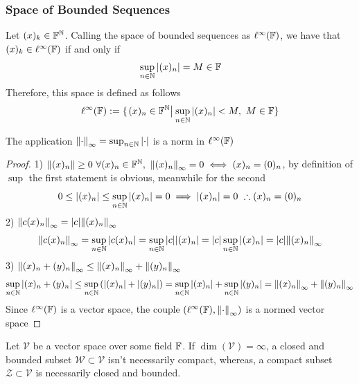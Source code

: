 \documentclass[../complete.tex]{subfiles}
\begin{document}
\subsubsection{Space of Bounded Sequences}
\begin{dfn}
	Let $(x)_k\in\mathbb{F}^{\mathbb{N}}$. Calling the space of bounded sequences as $\ell^\infty(\mathbb{F})$, we have that $(x)_k\in\ell^\infty(\mathbb{F})$ if and only if
	\begin{equation}
		\sup_{n\in\mathbb{N}}\abs{(x)_n}=M\in\mathbb{F}
		\label{eq:boundedseq}
	\end{equation}
	Therefore, this space is defined as follows
	\begin{equation}
		\ell^\infty(\F):=\{\derin{(x)_n\in\F^{\N}}\sup_{n\in\N}\abs{(x)_n}<M,\ M\in\F\}
		\label{eq:ellinf}
	\end{equation}
\end{dfn}
\begin{thm}
	The application $\norm{\cdot}_{\infty}=\sup_{n\in\mathbb{N}}\abs{\cdot}$ is a norm in $\ell^\infty(\mathbb{F})$
\end{thm}
\begin{proof}
	1) $\norm{(x)_n}\ge0\ \forall(x)_n\in\F^{\N},\ \norm{(x)_n}_{\infty}=0\iff(x)_n=(0)_n$, by definition of $\sup$ the first statement is obvious, meanwhile for the second
	\begin{equation*}
		0\le\abs{(x)_n}\le\sup_{n\in\N}\abs{(x)_{n}}=0\implies{}\abs{(x)_n}=0\ \therefore(x)_n=(0)_n
	\end{equation*}
	2) $\norm{c(x)_n}_{\infty}=\abs{c}\norm{(x)_n}_{\infty}$
	\begin{equation*}
		\norm{c(x)_n}_{\infty}=\sup_{n\in\mathbb{N}}\abs{c(x)_n}=\sup_{n\in\mathbb{N}}\abs{c}\abs{(x)_n}=\abs{c}\sup_{n\in\mathbb{N}}\abs{(x)_n}=\abs{c}\norm{(x)_n}_{\infty}
	\end{equation*}
	3) $\norm{(x)_n+(y)_n}_{\infty}\le\norm{(x)_n}_\infty+\norm{(y)_n}_\infty$
	\begin{equation*}
		\sup_{n\in\mathbb{N}}\abs{(x)_n+(y)_n}\le\sup_{n\in\mathbb{N}}\left( \abs{(x)_n}+\abs{(y)_n} \right)=\sup_{n\in\mathbb{N}}\abs{(x)_n}+\sup_{n\in\mathbb{N}}\abs{(y)_n}=\norm{(x)_n}_\infty+\norm{(y)_n}_\infty
	\end{equation*}
	Since $\ell^\infty(\mathbb{F})$ is a vector space, the couple $(\ell^\infty(\mathbb{F}),\norm{\cdot}_{\infty})$ is a normed vector space
\end{proof}
\begin{rmk}
	Let $\mathcal{V}$ be a vector space over some field $\mathbb{F}$. If $\dim(\mathcal{V})=\infty$, a closed and bounded subset $\mathcal{W}\subset\mathcal{V}$ isn't necessarily compact, whereas, a compact subset $\mathcal{Z}\subset\mathcal{V}$ is necessarily closed and bounded.
\end{rmk}
\end{document}
